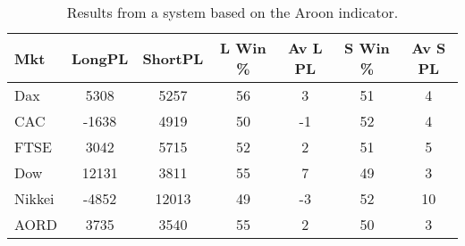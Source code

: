 \begin{table}[ht]
\centering
\caption[Results from a system based on the Aroon indicator]{Results from a system based on the Aroon indicator.} 
\label{tab:aroon_results}
\begin{tabular}{lcccccc}
  \toprule Mkt & LongPL & ShortPL & L Win \% & Av L PL & S Win \% & Av S PL \\ 
  \midrule Dax & 5308 & 5257 & 56 & 3 & 51 & 4 \\ 
  CAC & -1638 & 4919 & 50 & -1 & 52 & 4 \\ 
  FTSE & 3042 & 5715 & 52 & 2 & 51 & 5 \\ 
  Dow & 12131 & 3811 & 55 & 7 & 49 & 3 \\ 
  Nikkei & -4852 & 12013 & 49 & -3 & 52 & 10 \\ 
  AORD & 3735 & 3540 & 55 & 2 & 50 & 3 \\ 
   \bottomrule \end{tabular}
\end{table}
